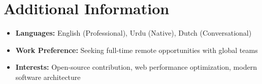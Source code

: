 \section{Additional Information}
\begin{itemize}
\item \textbf{Languages:} English (Professional), Urdu (Native), Dutch (Conversational)
\item \textbf{Work Preference:} Seeking full-time remote opportunities with global teams
\item \textbf{Interests:} Open-source contribution, web performance optimization, modern software architecture
\end{itemize}




